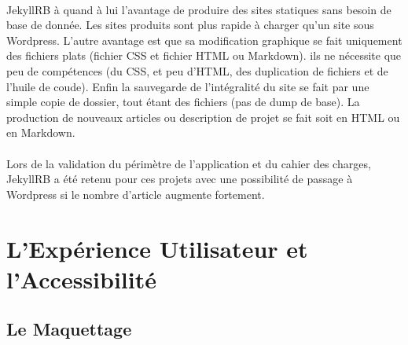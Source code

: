 \documentclass[11pt,a4paper]{report}
\begin{document}
		\paragraph*{}JekyllRB à quand à lui l'avantage de produire des sites statiques sans besoin de base de donnée. Les sites produits sont plus rapide à charger qu'un site sous Wordpress. L'autre avantage est que sa modification graphique se fait uniquement des fichiers plats (fichier CSS et fichier HTML ou Markdown). ils ne nécessite que peu de compétences (du CSS, et peu d'HTML, des duplication de fichiers et de l'huile de coude). Enfin la sauvegarde de l'intégralité du site se fait par une simple copie de dossier, tout étant des fichiers (pas de dump de base). La production de nouveaux articles ou description de projet se fait soit en HTML ou en Markdown.
		\paragraph*{}Lors de la validation du périmètre de l'application et du cahier des charges, JekyllRB a été retenu pour ces projets avec une possibilité de passage à Wordpress si le nombre d'article augmente fortement.
		\newpage

	\section{L'Expérience Utilisateur et l'Accessibilité}
		\subsection{Le Maquettage}
\end{document}
